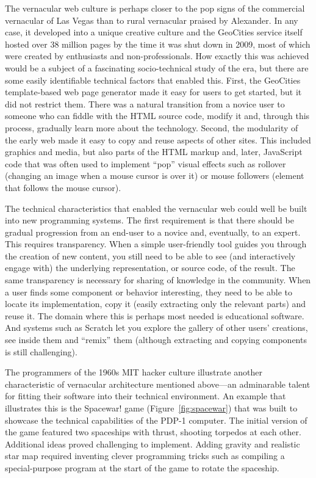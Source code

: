 The vernacular web culture is perhaps closer to the pop signs of the commercial vernacular
of Las Vegas than to rural vernacular praised by Alexander. In any case, it developed into a unique
creative culture and the GeoCities service itself hosted over 38 million pages by the time it was
shut down in 2009, most of which were created by enthusiasts and non-professionals. How exactly
this was achieved would be a subject of a fascinating socio-technical study of the era, but
there are some easily identifiable technical factors that enabled this. First, the GeoCities
template-based web page generator made it easy for users to get started, but it did not restrict
them. There was a natural transition from a novice user to someone who can fiddle with the
HTML source code, modify it and, through this process, gradually learn more about the technology.
Second, the modularity of the early web made it easy to copy and reuse aspects of other sites.
This included graphics and media, but also parts of the HTML markup and, later, JavaScript code
that was often used to implement ``pop'' visual effects such as rollover (changing an image when
a mouse cursor is over it) or mouse followers (element that follows the mouse cursor).

The technical characteristics that enabled the vernacular web could well be built into new
programming systems. The first requirement is that there should be gradual progression from
an end-user to a novice and, eventually, to an expert. This requires transparency. When a
simple user-friendly tool guides you through the creation of new content, you still need to be
able to see (and interactively engage with) the underlying representation, or source code, of
the result. The same transparency is necessary for sharing of knowledge in the community.
When a user finds some component or behavior interesting, they need to be able to locate its
implementation, copy it (easily extracting only the relevant parts) and reuse it. The domain
where this is perhaps most needed is educational software. And systems such as Scratch let
you explore the gallery of other users' creations, see inside them and ``remix'' them
(although extracting and copying components is still challenging).

The programmers of the 1960s MIT hacker culture illustrate another characteristic of
vernacular architecture mentioned above---an adminarable talent for fitting their software
into their technical environment. An example that illustrates this is the Spacewar! game
(Figure~\ref{fig:spacewar}) that was built to showcase the technical capabilities of the
PDP-1 computer. The initial version of the game featured two spaceships with thrust, shooting
torpedos at each other. Additional ideas proved challenging to implement. Adding gravity and
realistic star map required inventing clever programming tricks such as compiling a special-purpose
program at the start of the game to rotate the spaceship.

